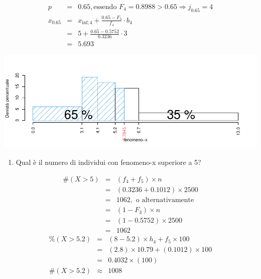 \documentclass[
  11pt,
]{book}
\providecommand{\tightlist}{%
  \setlength{\itemsep}{0pt}\setlength{\parskip}{0pt}}
\theoremstyle{mytheoremstyle}
\theoremstyle{mydefstyle}
\newenvironment{sol}
  {
  \begin{tcolorbox}[enhanced,breakable,arc=0.1mm,boxrule=1pt,colback=white,colframe=iblue,
  title=\bf \fontfamily{lmss}\selectfont \hspace{.5 cm} Soluzione,drop fuzzy shadow]

}{
\end{tcolorbox}
  }
\begin{document}
\begin{sol}

\begin{eqnarray*}
  p &=&  0.65 , \text{essendo }F_{ 4 }= 0.8988  > 0.65  \Rightarrow j_{ 0.65 }= 4 \\
  x_{ 0.65 } &=& x_{\text{inf}; 4 } + \frac{ { 0.65 } - F_{ 3 }} {f_{ 4 }} \cdot b_{ 4 } \\
            &=&  5  + \frac {{ 0.65 } -  0.5752 } { 0.3236 } \cdot  3  \\
            &=&  5.693 
\end{eqnarray*}

\begin{center}\includegraphics{Esami_passati_con_soluzioni_files/figure-latex/6-1} \end{center}

\end{sol}

\begin{enumerate}
\def\labelenumi{\alph{enumi}.}
\setcounter{enumi}{2}
\tightlist
\item
  Qual è il numero di individui con fenomeno-x superiore a 5?
\end{enumerate}

\begin{sol}
\begin{eqnarray*}
  \#(X>5) &=&  (f_4+f_5)\times n\\
            &=& (0.3236+0.1012)\times 2500\\
            &=& 1062,\text{ o alternativamente}\\
            &=& (1-F_3)\times n\\
            &=& (1-0.5752)\times 2500\\
            &=& 1062
\end{eqnarray*}
\begin{eqnarray*}
     \%(X> 5.2 ) &=& ( 8 - 5.2 )\times h_{ 4 }+ f_{ 5 }\times 100 \\
              &=& ( 2.8 )\times 10.79 + ( 0.1012 )\times 100 \\
              &=&  0.4032 \times(100)\\
     \#(X> 5.2 ) &\approx& 1008 
         \end{eqnarray*}

\end{sol}
\end{document}
